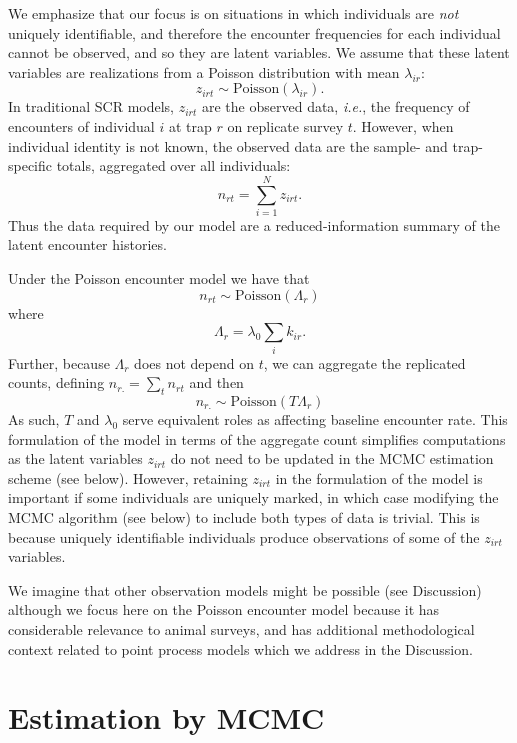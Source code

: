 We emphasize that our focus is on
situations in which individuals are {\it not}
uniquely identifiable, and therefore the encounter frequencies
for each individual
cannot be observed, and so they are latent variables. We assume that
these latent variables are realizations from a Poisson distribution
with mean $\lambda_{ir}$:
\begin{equation}
 z_{irt} \sim \mbox{Poisson}(\lambda_{ir}).
\label{eq.latentPoisson}
\end{equation}
In traditional SCR models, $z_{irt}$ are the observed data, {\it
  i.e.}, the frequency of encounters of individual $i$ at trap $r$ on
replicate survey $t$. However, when individual identity is not known,
the observed data are the sample- and trap-specific totals,
aggregated over all individuals:
\[
n_{rt} = \sum_{i=1}^{N} z_{irt}.
\]
Thus the data required by our model are a reduced-information
summary of the latent encounter histories.


Under the Poisson encounter model we have that
\begin{equation}
n_{rt} \sim \mbox{Poisson}( \Lambda_{r} )
\label{eq:nagg}
\end{equation}
where
\[
 \Lambda_{r} = \lambda_{0} \sum_{i} k_{ir}.
\]
Further, because $\Lambda_{r}$ does not depend on $t$, we can
aggregate the replicated counts, defining
$n_{r.} = \sum_{t} n_{rt}$ and then
\[
 n_{r.} \sim \mbox{Poisson}( T \Lambda_{r} )
\]
As such, $T$ and $\lambda_{0}$ serve equivalent roles as affecting
baseline encounter rate.
This formulation of the model in terms of the aggregate count
simplifies computations as the latent variables
$z_{irt}$ do not need to be updated in the MCMC estimation
scheme (see below). However, retaining $z_{irt}$
in the formulation of the model
is important if some individuals are uniquely marked, in which case
modifying
the MCMC algorithm (see below) to include both types of data is
trivial. This is because uniquely identifiable individuals produce
observations of some of the $z_{irt}$ variables.

We imagine that other observation models
might be possible (see Discussion) although we focus here on the
Poisson encounter model because it has considerable relevance to
animal surveys, and has additional methodological context related to
point process models which we address in the Discussion.





\section{Estimation by MCMC}
\label{s:mcmc}

